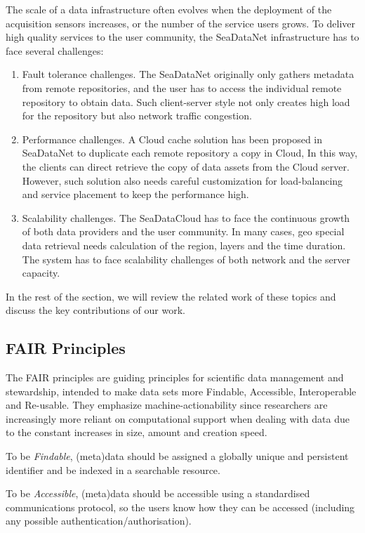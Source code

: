 \documentclass[conference]{IEEEtran}
\begin{document}
The scale of a data infrastructure often evolves when the deployment of the acquisition sensors increases, or the number of the service users grows. To deliver high quality services to the user community, the SeaDataNet infrastructure has to face several challenges:
\begin{enumerate}
    \item Fault tolerance challenges. The SeaDataNet originally only gathers metadata from remote repositories, and the user has to access the individual remote repository to obtain data. Such client-server style not only creates high load for the repository but also network traffic congestion.
    \item Performance challenges. A Cloud cache solution has been proposed in SeaDataNet to duplicate each remote repository a copy in Cloud, In this way, the clients can direct retrieve the copy of data assets from the Cloud server. However, such solution also needs careful customization for load-balancing and service placement to keep the performance high.
    \item Scalability challenges. The SeaDataCloud has to face the continuous growth of both data providers and the user community. In many cases, geo special data retrieval needs calculation of the region, layers and the time duration. The system has to face scalability challenges of both network and the server capacity. 
\end{enumerate}
In the rest of the section, we will review the related work of these topics and discuss the key contributions of our work. 
\subsection{FAIR Principles}

The FAIR principles \cite{fair} \cite{wilkinson2016fair} are guiding principles for scientific data management and stewardship, intended to make data sets more Findable, Accessible, Interoperable and Re-usable. They emphasize machine-actionability since researchers are increasingly more reliant on computational support when dealing with data due to the constant increases in size, amount and creation speed.

To be \textit{Findable}, (meta)data should be assigned a globally unique and persistent identifier and be indexed in a searchable resource.

To be \textit{Accessible}, (meta)data should be accessible using a standardised communications protocol, so the users know how they can be accessed (including any possible authentication/authorisation).
\end{document}
